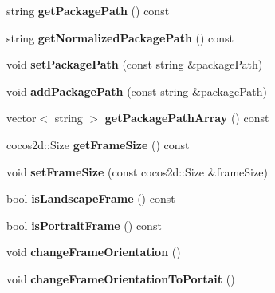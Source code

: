 \begin{DoxyCompactItemize}
string {\bfseries get\+Package\+Path} () const
\item 
\mbox{\label{classProjectConfig_ad1567d49ae80efbbc64f30682180e48b}} 
string {\bfseries get\+Normalized\+Package\+Path} () const
\item 
\mbox{\label{classProjectConfig_aeea4d6d2383272601b1cdfd94eedfb58}} 
void {\bfseries set\+Package\+Path} (const string \&package\+Path)
\item 
\mbox{\label{classProjectConfig_a4b3ff7de45a51524739682ce8bb5b00b}} 
void {\bfseries add\+Package\+Path} (const string \&package\+Path)
\item 
\mbox{\label{classProjectConfig_a81c4259fe956c1a2935e9ef5fc02ed97}} 
vector$<$ string $>$ {\bfseries get\+Package\+Path\+Array} () const
\item 
\mbox{\label{classProjectConfig_a5ca7f7e6efb658dd7e9d7012b4701e2e}} 
cocos2d\+::\+Size {\bfseries get\+Frame\+Size} () const
\item 
\mbox{\label{classProjectConfig_a5627810cb0f409c6258af72d5056a945}} 
void {\bfseries set\+Frame\+Size} (const cocos2d\+::\+Size \&frame\+Size)
\item 
\mbox{\label{classProjectConfig_a410e2b0ec320431d2436fbc5628d9858}} 
bool {\bfseries is\+Landscape\+Frame} () const
\item 
\mbox{\label{classProjectConfig_adc48e9230973a3add70ee74e040b01e0}} 
bool {\bfseries is\+Portrait\+Frame} () const
\item 
\mbox{\label{classProjectConfig_ae1c71b5c9816200dfd1128b0b30f4537}} 
void {\bfseries change\+Frame\+Orientation} ()
\item 
\mbox{\label{classProjectConfig_a2c84127ec4c2b57f44658b2f7397b609}} 
void {\bfseries change\+Frame\+Orientation\+To\+Portait} ()
\item 
\mbox{\label{classProjectConfig_a89f8a4caea7386cba65130d6b031cb65}} 

\end{DoxyCompactItemize}
